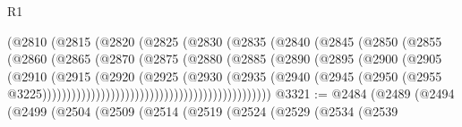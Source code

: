 \begin{lexlean}{R1}
\begin{coremodule}
                                      (@2810
                                        (@2815
                                          (@2820
                                            (@2825
                                              (@2830
                                                (@2835
                                                  (@2840
                                                    (@2845
                                                      (@2850
                                                        (@2855
                                                          (@2860
                                                            (@2865
                                                              (@2870
                                                                (@2875
                                                                  (@2880
                                                                    (@2885
                                                                      (@2890
                                                                        (@2895
                                                                          (@2900
                                                                            (@2905
                                                                              (@2910
                                                                                (@2915
                                                                                  (@2920
                                                                                    (@2925
                                                                                      (@2930
                                                                                        (@2935
                                                                                          (@2940
                                                                                            (@2945
                                                                                              (@2950
                                                                                                (@2955
                                                                                                  @3225)))))))))))))))))))))))))))))))))))))))))))))))
@3321 := @2484
    (@2489
      (@2494
        (@2499
          (@2504
            (@2509
              (@2514
                (@2519
                  (@2524
                    (@2529
                      (@2534
                        (@2539

\end{coremodule}
\end{lexlean}
